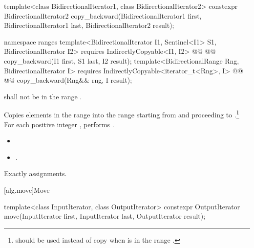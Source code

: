 %
\begin{itemdecl}
template<class BidirectionalIterator1, class BidirectionalIterator2>
  constexpr BidirectionalIterator2
    copy_backward(BidirectionalIterator1 first,
                  BidirectionalIterator1 last,
                  BidirectionalIterator2 result);
\end{itemdecl}\begin{addedblock}\begin{itemdecl}
namespace ranges {
  template<BidirectionalIterator I1, Sentinel<I1> S1, BidirectionalIterator I2>
    requires IndirectlyCopyable<I1, I2>
    @@
    @@
      copy_backward(I1 first, S1 last, I2 result);
  template<BidirectionalRange Rng, BidirectionalIterator I>
    requires IndirectlyCopyable<iterator_t<Rng>, I>
    @@
    @@
      copy_backward(Rng&& rng, I result);
}
\end{itemdecl}\end{addedblock}

\begin{itemdescr}
\pnum
\requires
{}
shall not be in the range
.

\pnum
\effects
Copies elements in the range 
into the
range 
starting from
and proceeding to .\footnote{
should be used instead of copy when 
is in
the range
.}
For each positive integer
,
performs
.

\pnum
\returns
\begin{itemize}
\item {}
\item {}
  .
\end{itemize}

\pnum
\complexity
Exactly
assignments.
\end{itemdescr}

[alg.move]{Move}

%
\begin{itemdecl}
template<class InputIterator, class OutputIterator>
  constexpr OutputIterator move(InputIterator first, InputIterator last,
                                OutputIterator result);
\end{itemdecl}

